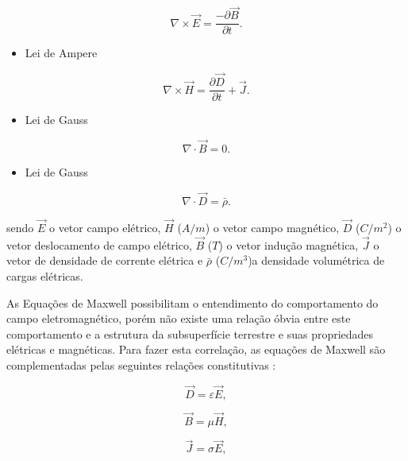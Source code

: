 \begin{equation}
	\nabla\times\vec{E} = \frac{-\partial \vec{B}}{\partial t}.
\end{equation}

\begin{itemize}
	\item Lei de Ampere
\end{itemize}

\begin{equation}
\nabla\times\vec{H} = \frac{\partial \vec{D}}{\partial t} + \vec{J}.
\end{equation}

\begin{itemize}
	\item Lei de Gauss
\end{itemize}

\begin{equation}
\nabla\cdot\vec{B} = 0.
\end{equation}

\begin{itemize}
	\item Lei de Gauss
\end{itemize}

\begin{equation}
\nabla\cdot\vec{D} = \bar{\rho}.
\end{equation}

 sendo $\vec{E}$ o vetor campo elétrico, $\vec{H}$ ($A/m$) o vetor campo magnético, $\vec{D}$ ($C/m^{2}$) o vetor deslocamento de campo elétrico, $\vec{B}$ ($T$) o vetor indução magnética, $\vec{J}$ o vetor de densidade de corrente elétrica e $\bar{\rho}$ ($C/m^{3}$)a densidade volumétrica de cargas elétricas.
 
As Equações de Maxwell possibilitam o entendimento do comportamento do campo eletromagnético, porém não existe uma relação óbvia entre este comportamento e a estrutura da subsuperfície terrestre e suas propriedades elétricas e magnéticas. Para fazer esta correlação, as equações de Maxwell são complementadas pelas seguintes relações constitutivas \cite{Lugao93}:

\begin{equation}
\vec{D} = \varepsilon \vec{E},
\label{c1}
\end{equation}


\begin{equation}
\vec{B} = \mu \vec{H},
\label{c2}
\end{equation}

\begin{equation}
\vec{J} = {\sigma} \vec{E},
\label{c3}
\end{equation}

